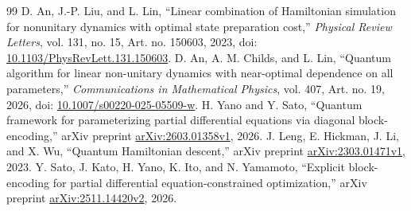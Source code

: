 \begin{thebibliography}{99}
\setlength{\itemsep}{0pt}
 D. An, J.-P. Liu, and L. Lin, ``Linear combination of Hamiltonian simulation for nonunitary dynamics with optimal state preparation cost,'' \emph{Physical Review Letters}, vol. 131, no. 15, Art. no. 150603, 2023, doi: \href{https://doi.org/10.1103/PhysRevLett.131.150603}{10.1103/PhysRevLett.131.150603}.
 D. An, A. M. Childs, and L. Lin, ``Quantum algorithm for linear non-unitary dynamics with near-optimal dependence on all parameters,'' \emph{Communications in Mathematical Physics}, vol. 407, Art. no. 19, 2026, doi: \href{https://doi.org/10.1007/s00220-025-05509-w}{10.1007/s00220-025-05509-w}.
 H. Yano and Y. Sato, ``Quantum framework for parameterizing partial differential equations via diagonal block-encoding,'' arXiv preprint \href{https://arxiv.org/abs/2603.01358v1}{arXiv:2603.01358v1}, 2026.
 J. Leng, E. Hickman, J. Li, and X. Wu, ``Quantum Hamiltonian descent,'' arXiv preprint \href{https://arxiv.org/abs/2303.01471v1}{arXiv:2303.01471v1}, 2023.
 Y. Sato, J. Kato, H. Yano, K. Ito, and N. Yamamoto, ``Explicit block-encoding for partial differential equation-constrained optimization,'' arXiv preprint \href{https://arxiv.org/abs/2511.14420v2}{arXiv:2511.14420v2}, 2026.
\end{thebibliography}
